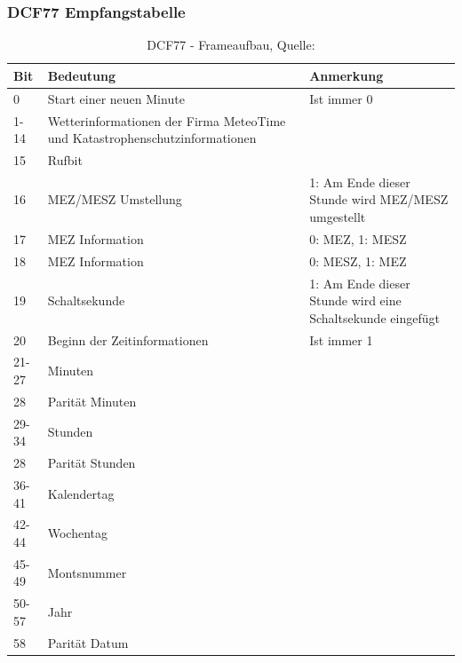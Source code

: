 \subsubsection{DCF77 Empfangstabelle}
	\begin{table}[H]
		\begin{tabular}{ |l|p{7cm}| p{5cm}| }
			\hline \textbf{Bit} & \textbf{Bedeutung} & \textbf{Anmerkung} \\ 
			\hline 0 & Start einer neuen Minute & Ist immer 0 \\ 
			\hline 1-14 & Wetterinformationen der Firma MeteoTime und Katastrophenschutzinformationen & \\
			\hline 15 & Rufbit & \\
			\hline 16 & MEZ/MESZ Umstellung & 1: Am Ende dieser Stunde wird MEZ/MESZ umgestellt \\
			\hline 17 & MEZ Information & 0: MEZ, 1: MESZ \\
			\hline 18 & MEZ Information & 0: MESZ, 1: MEZ \\
			\hline 19 & Schaltsekunde & 1: Am Ende dieser Stunde wird eine Schaltsekunde eingefügt \\
			\hline 20 & Beginn der Zeitinformationen & Ist immer 1 \\
			\hline 21-27 & Minuten & \\
			\hline 28 & Parität Minuten & \\
			\hline 29-34 & Stunden & \\
			\hline 28 & Parität Stunden & \\
			\hline 36-41 & Kalendertag & \\
			\hline 42-44 & Wochentag & \\
			\hline 45-49 & Montsnummer & \\
			\hline 50-57 & Jahr & \\
			\hline 58 & Parität Datum & \\
			\hline 
		\end{tabular}
		\caption[DCF77 - Frameaufbau]{DCF77 - Frameaufbau, Quelle: \cite{DCF77Wiki}}
		\label{table:DCF77Frame}
	\end{table}

